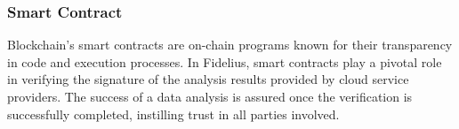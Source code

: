\subsubsection{Smart Contract}
Blockchain's smart contracts are on-chain programs known for their transparency in code and execution processes. In Fidelius, smart contracts play a pivotal role in verifying the signature of the analysis results provided by cloud service providers. The success of a data analysis is assured once the verification is successfully completed, instilling trust in all parties involved.


